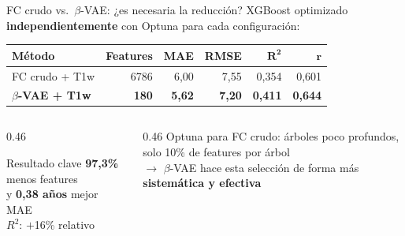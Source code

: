 \documentclass[aspectratio=169, 11pt]{beamer}
\newcommand{\highlight}[1]{\textcolor{uncaccent}{\textbf{#1}}}
\begin{document}
\begin{frame}{FC crudo vs.\ $\beta$-VAE: ¿es necesaria la reducción?}
  {\small XGBoost optimizado \textbf{independientemente} con Optuna para cada configuración:}

  \vspace{0.2cm}
  \centering
  {\small
  \begin{tabular}{lrrrrr}
    \toprule
    \textbf{Método} & \textbf{Features} & \textbf{MAE} & \textbf{RMSE} & $\boldsymbol{R^2}$ & $\boldsymbol{r}$ \\
    \midrule
    FC crudo + T1w & 6786 & 6,00 & 7,55 & 0,354 & 0,601 \\
    \rowcolor{unclight}
    \textbf{$\beta$-VAE + T1w} & \textbf{180} & \textbf{5,62} & \textbf{7,20} & \textbf{0,411} & \textbf{0,644} \\
    \bottomrule
  \end{tabular}}

  \vspace{0.4cm}
  \begin{columns}[T]
    \begin{column}{0.46\textwidth}
      \begin{block}{Resultado clave}
        \centering
        \highlight{97,3\%} menos features\\y \highlight{0,38 años} mejor MAE\\[4pt]
        {\small $R^2$: $+$16\% relativo}
      \end{block}
    \end{column}
    \begin{column}{0.46\textwidth}
      \vspace{0.2cm}
      Optuna para FC crudo: árboles poco profundos, solo 10\% de features por árbol\\[6pt]
      $\rightarrow$ $\beta$-VAE hace esta selección de forma más \highlight{sistemática y efectiva}
    \end{column}
  \end{columns}
\end{frame}
\end{document}
